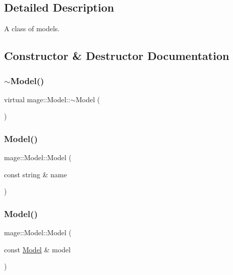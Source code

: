\subsection{Detailed Description}
A class of models. 

\subsection{Constructor \& Destructor Documentation}
\hypertarget{classmage_1_1_model_afc6e31cb05ca98c456db56a3e03743d7}{}\label{classmage_1_1_model_afc6e31cb05ca98c456db56a3e03743d7} 
\subsubsection{\texorpdfstring{$\sim$\+Model()}{~Model()}}
{\footnotesize\ttfamily virtual mage\+::\+Model\+::$\sim$\+Model (\begin{DoxyParamCaption}{ }\end{DoxyParamCaption})\hspace{0.3cm}{\ttfamily [virtual]}}

\hypertarget{classmage_1_1_model_adc37cc2030a93cde5da20f9a941c060e}{}\label{classmage_1_1_model_adc37cc2030a93cde5da20f9a941c060e} 
\subsubsection{\texorpdfstring{Model()}{Model()}\hspace{0.1cm}{\footnotesize\ttfamily [1/3]}}
{\footnotesize\ttfamily mage\+::\+Model\+::\+Model (\begin{DoxyParamCaption}\item[{const string \&}]{name }\end{DoxyParamCaption})\hspace{0.3cm}{\ttfamily [protected]}}

\hypertarget{classmage_1_1_model_ac5f1d340bbfefd30bec3e6343a86059a}{}\label{classmage_1_1_model_ac5f1d340bbfefd30bec3e6343a86059a} 
\subsubsection{\texorpdfstring{Model()}{Model()}\hspace{0.1cm}{\footnotesize\ttfamily [2/3]}}
{\footnotesize\ttfamily mage\+::\+Model\+::\+Model (\begin{DoxyParamCaption}\item[{const \hyperlink{classmage_1_1_model}{Model} \&}]{model }\end{DoxyParamCaption})\hspace{0.3cm}{\ttfamily [protected]}}

